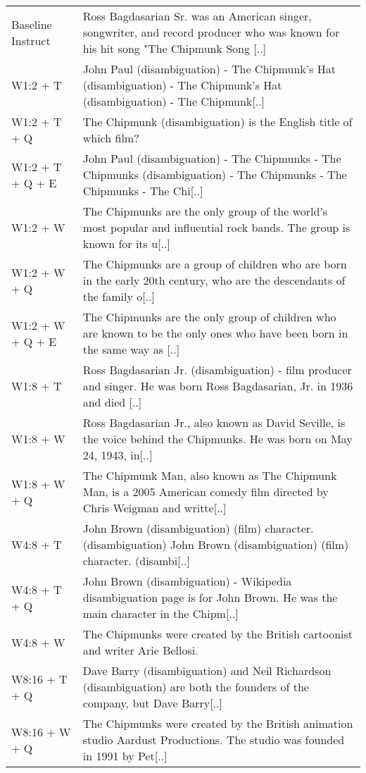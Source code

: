 {\begin{longtable}{@{}l p{\dimexpr\textwidth-3cm-4\tabcolsep}@{}}
\hline
\endlastfoot
Baseline Instruct & Ross Bagdasarian Sr. was an American singer, songwriter, and record producer who was known for his hit song "The Chipmunk Song [..] \\
W1:2 + T & John Paul (disambiguation) - The Chipmunk's Hat (disambiguation) - The Chipmunk's Hat (disambiguation) - The Chipmunk[..] \\
W1:2 + T + Q & The Chipmunk (disambiguation) is the English title of which film? \\
W1:2 + T + Q + E & John Paul (disambiguation) - The Chipmunks - The Chipmunks (disambiguation) - The Chipmunks - The Chipmunks - The Chi[..] \\
W1:2 + W & The Chipmunks are the only group of the world's most popular and influential rock bands. The group is known for its u[..] \\
W1:2 + W + Q & The Chipmunks are a group of children who are born in the early 20th century, who are the descendants of the family o[..] \\
W1:2 + W + Q + E & The Chipmunks are the only group of children who are known to be the only ones who have been born in the same way as [..] \\
W1:8 + T & Ross Bagdasarian Jr. (disambiguation) - film producer and singer. He was born Ross Bagdasarian, Jr. in 1936 and died [..] \\
W1:8 + W & Ross Bagdasarian Jr., also known as David Seville, is the voice behind the Chipmunks. He was born on May 24, 1943, in[..] \\
W1:8 + W + Q & The Chipmunk Man, also known as The Chipmunk Man, is a 2005 American comedy film directed by Chris Weigman and writte[..] \\
W4:8 + T & John Brown (disambiguation) (film) character. (disambiguation) John Brown (disambiguation) (film) character. (disambi[..] \\
W4:8 + T + Q & John Brown (disambiguation) - Wikipedia disambiguation page is for John Brown. He was the main character in the Chipm[..] \\
W4:8 + W & The Chipmunks were created by the British cartoonist and writer Arie Bellosi.  \\
W8:16 + T + Q & Dave Barry (disambiguation) and Neil Richardson (disambiguation) are both the founders of the company, but Dave Barry[..] \\
W8:16 + W + Q & The Chipmunks were created by the British animation studio Aardust Productions. The studio was founded in 1991 by Pet[..] \\

\end{longtable}}
